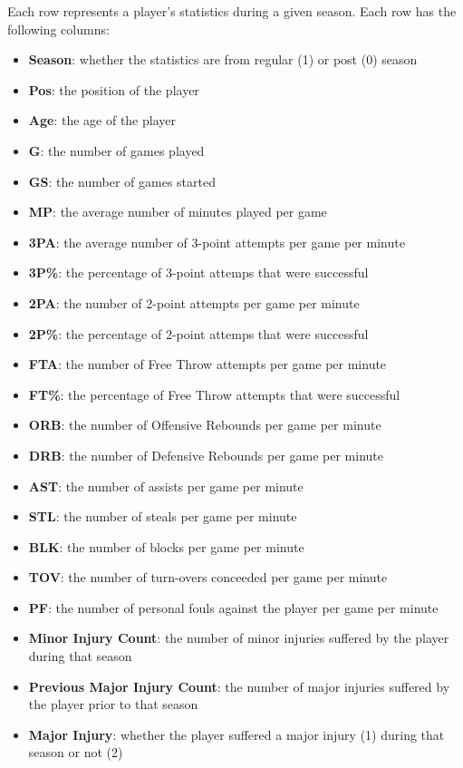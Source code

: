 \documentclass{article}
\begin{document}
\label{appendix:final-dataset}
Each row represents a player's statistics during a given season. 
Each row has the following columns:
\begin{itemize}
    \item \textbf{Season}: whether the statistics are from regular (1) or post (0) season
    \item \textbf{Pos}: the position of the player
    \item \textbf{Age}: the age of the player
    \item \textbf{G}: the number of games played
    \item \textbf{GS}: the number of games started
    \item \textbf{MP}: the average number of minutes played per game
    \item \textbf{3PA}: the average number of 3-point attempts per game per minute
    \item \textbf{3P\%}: the percentage of 3-point attemps that were successful
    \item \textbf{2PA}: the number of 2-point attempts per game per minute
    \item \textbf{2P\%}: the percentage of 2-point attemps that were successful
    \item \textbf{FTA}: the number of Free Throw attempts per game per minute
    \item \textbf{FT\%}: the percentage of Free Throw attempts that were successful
    \item \textbf{ORB}: the number of Offensive Rebounds per game per minute
    \item \textbf{DRB}: the number of Defensive Rebounds per game per minute
    \item \textbf{AST}: the number of assists per game per minute
    \item \textbf{STL}: the number of steals per game per minute
    \item \textbf{BLK}: the number of blocks per game per minute
    \item \textbf{TOV}: the number of turn-overs conceeded per game per minute
    \item \textbf{PF}: the number of personal fouls against the player per game per minute
    \item \textbf{Minor Injury Count}: the number of minor injuries suffered by the player during that season
    \item \textbf{Previous Major Injury Count}: the number of major injuries suffered by the player prior to that season
    \item \textbf{Major Injury}: whether the player suffered a major injury (1) during that season or not (2)
\end{itemize}
\end{document}
